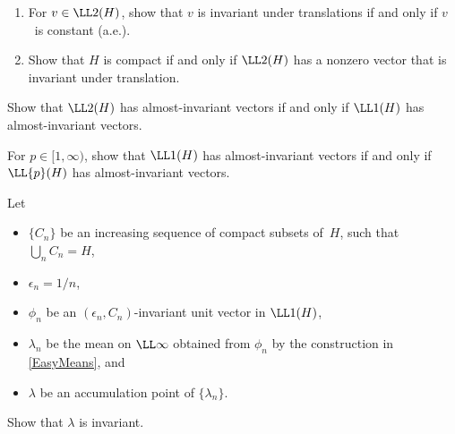 \begin{exercises}

\item \label{NonCpctNoInvtVect} 
\begin{enumerate}
\item For $v \in \LL2(H)$, show that $v$ is invariant under translations if and only if $v$~is constant (a.e.).
\item Show that $H$ is compact if and only if  $\LL2(H)$ has a nonzero vector that is invariant under translation.
\end{enumerate}

\item \label{L2invtIffL1invEx}
Show that $\LL2(H)$ has almost-invariant vectors if and only if $\LL1(H)$ has almost-invariant vectors.

\item \label{L1invtIffLpInvEx}
For $p \in [1,\infty)$, show that $\LL1(H)$ has almost-invariant vectors if and only if $\LL{p}(H)$ has almost-invariant vectors. 

\item \label{LimAlmInvMean}
Let
\noprelistbreak
	\begin{itemize}
	\item $\{C_n\}$ be an increasing sequence of compact subsets of~$H$, such that $\bigcup_n C_n = H$,
	\item $\epsilon_n = 1/n$,
	\item $\phi_n$ be an $(\epsilon_n,C_n)$-invariant unit vector in $\LL1(H)$, 
	\item $\lambda_n$ be the mean on $\LL\infty$ obtained from $\phi_n$ by the construction in \cref{EasyMeans},
	and
	\item $\lambda$ be an accumulation point of $\{\lambda_n\}$.
	\end{itemize}
Show that $\lambda$ is invariant.


\end{exercises}
